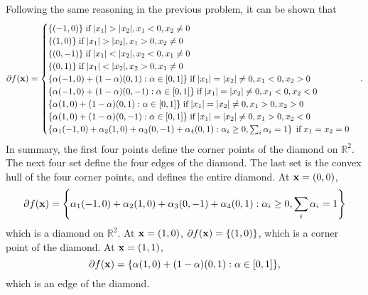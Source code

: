 \documentclass{scrartcl}
\begin{document}
Following the same reasoning in the previous problem, it can be shown that
\begin{equation}
\partial f(\mathbf{x}) =
\begin{cases}
\{ (-1,0)\} \; \text{if\;} |x_1| > |x_2|, x_1 < 0, x_2 \ne 0 \\
\{ (1,0)\} \; \text{if\;}   |x_1| > |x_2|, x_1 > 0, x_2 \ne 0 \\
\{ (0,-1)\} \; \text{if\;} |x_1| < |x_2|, x_2 < 0, x_1 \ne 0 \\
\{ (0,1)\} \; \text{if\;} |x_1| < |x_2|, x_2 > 0, x_1 \ne 0 \\
\{ \alpha (-1,0) + (1-\alpha) (0, 1) : \alpha \in [0,1] \} \; \text{if\;} |x_1| = |x_2| \ne 0, x_1 < 0, x_2 > 0 \\
\{ \alpha (-1,0) + (1-\alpha) (0, -1) : \alpha \in [0,1] \} \; \text{if\;} |x_1| = |x_2| \ne 0, x_1 < 0, x_2 < 0 \\
\{ \alpha (1,0) + (1-\alpha) (0, 1) : \alpha \in [0,1] \} \; \text{if\;} |x_1| = |x_2| \ne 0, x_1 > 0, x_2 > 0 \\
\{ \alpha (1,0) + (1-\alpha) (0, -1) : \alpha \in [0,1] \} \; \text{if\;} |x_1| = |x_2| \ne 0, x_1 > 0, x_2 < 0 \\
\left\lbrace 
    \alpha_1 (-1,0) + \alpha_2 (1,0) + \alpha_3(0,-1) + \alpha_4 (0,1): 
    \alpha_i \ge 0, \sum_i \alpha_i = 1
\right\rbrace \; \text{if\;} x_1 = x_2 = 0
\end{cases} .
\end{equation}
In summary, the first four points define the corner points of the diamond on $\mathbb{R}^2$.
The next four set define the four edges of the diamond.
The last set is the convex hull of the four corner points, and defines the entire diamond.
At $\mathbf{x} = (0,0)$,
\begin{equation}
\partial f(\mathbf{x}) = 
\left\lbrace 
    \alpha_1 (-1,0) + \alpha_2 (1,0) + \alpha_3(0,-1) + \alpha_4 (0,1): 
    \alpha_i \ge 0, \sum_i \alpha_i = 1
\right\rbrace
\end{equation}
which is a diamond on $\mathbb{R}^2$.
At $\mathbf{x} = (1,0)$, $\partial f(\mathbf{x}) =\{ (1,0)\}$, which is a corner point of the diamond.
At $\mathbf{x} = (1,1)$,
\begin{equation}
\partial f(\mathbf{x}) = \{ \alpha (1,0) + (1-\alpha) (0, 1) : \alpha \in [0,1] \},
\end{equation}
which is an edge of the diamond.
\end{document}

